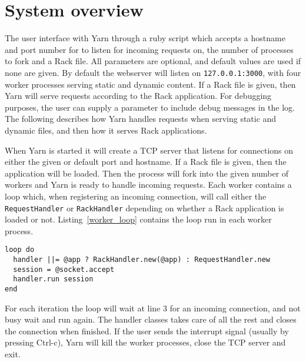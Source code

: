\section{System overview}

The user interface with Yarn through a ruby script which accepts a
hostname and port number for to listen for incoming requests on, the number
of processes to fork and a Rack file. All parameters are optional, and default
values are used if none are given. By default the webserver will listen on
\texttt{127.0.0.1:3000}, with four worker processes serving static and dynamic
content. If a Rack file is given, then Yarn will serve requests according to
the Rack application. For debugging purposes, the user can supply a parameter
to include debug messages in the log. The following describes how Yarn handles
requests when serving static and dynamic files, and then how it serves Rack
applications.

When Yarn is started it will create a TCP server that listens for connections
on either the given or default port and hostname. If a Rack file is given,
then the application will be loaded. Then the process will fork into the given
number of workers and Yarn is ready to handle incoming requests. Each worker
contains a loop which, when registering an incoming connection, will call
either the \texttt{RequestHandler} or \texttt{RackHandler} depending on
whether a Rack application is loaded or not. Listing~\ref{worker_loop}
contains the loop run in each worker process.

\newpage
\begin{lstlisting}[label=worker_loop,caption=Worker loop
(lib/yarn/server.rb:53)]
loop do
  handler ||= @app ? RackHandler.new(@app) : RequestHandler.new
  session = @socket.accept
  handler.run session 
end
\end{lstlisting}

For each iteration the loop will wait at line 3 for an incoming connection,
and not busy wait and run again. The handler classes takes care of all the
rest and closes the connection when finished. If the user sends
the interrupt signal (usually by pressing Ctrl-c), Yarn will kill the worker
processes, close the TCP server and exit.
